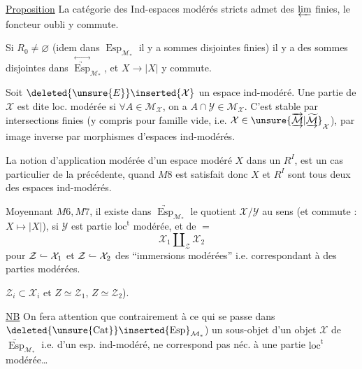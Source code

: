 \uline{Proposition} La catégorie des   Ind-espaces modérés stricts admet des $\varprojlim$ finies, le foncteur oubli y commute.

Si $R_0\ne\varnothing$ (idem dans $\operatorname{Esp}_{\mathcal M_*}$ il y a sommes disjointes finies) il y a des sommes disjointes   dans $\overset{\leftrightarrow}{\underrightarrow{\operatorname{Esp}}}_{\mathcal M_*}$, et $X\longrightarrow |X|$ y commute.

Soit $\deleted{\unsure{E}}\inserted{\mathcal X}$ un espace ind-modéré. Une partie  de $\mathcal X$ est dite loc. modérée si $\forall A\in\mathcal M_{\mathcal X}$, on a $A\cap\mathcal Y\in\mathcal M_{\mathcal X}$. C'est stable par intersections finies (y compris pour famille vide, i.e. $\mathcal X\in\unsure{\underrightarrow{\overrightarrow{\mathcal M}}|\underrightarrow{\widetilde{\mathcal M}}}_{\mathcal X}$), par image inverse par morphismes  d'espaces ind-modérés.

La notion d'application modérée d'un espace modéré $X$ dans un $R^I$, est un cas particulier de la précédente, quand $M8$ est satisfait donc $X$ et $R^I$ sont tous deux des espaces ind-modérés.

Moyennant $M6,M7$, il existe  dans $\underrightarrow{\operatorname{Esp}}_{\mathcal M_*}$ le quotient $\mathcal X/\mathcal Y$ au sens (et commute : $X\mapsto|X|$), si $\mathcal Y$ est partie $\mathrm{loc}^{\mathrm t}$ modérée, et de $=$
\[
 \mathcal X_1\amalg_{\mathcal Z}\mathcal X_2
\]
pour $\mathcal Z\lhook\joinrel\relbar\mathcal X_1$ et $\mathcal Z\lhook\joinrel\relbar\mathcal X_2$ des ``immersions modérées'' i.e. correspondant à des parties  modérées.

$\mathcal Z_i\subset\mathcal X_i$ et $Z\simeq\mathcal Z_1$, $Z\simeq\mathcal Z_2$).

\uline{NB} On fera attention que contrairement à ce qui se passe dans $\deleted{\unsure{\operatorname{Cat}}}\inserted{\operatorname{Esp}}_{\mathcal M_*}$) un sous-objet d'un objet $\mathcal X$ de $\underrightarrow{\operatorname{Esp}}_{\mathcal M_*}$ i.e. d'un esp. ind-modéré, ne correspond pas néc. à une partie $\mathrm{loc}^{\mathrm t}$ modérée\ldots


